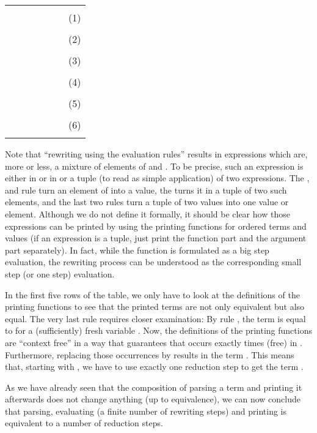 \documentclass[submission,copyright,creativecommons]{eptcs}
\newcommand{\lab}[1]{\mbox{(#1)}}
\begin{document}
\begin{center}
\begin{tabular}{|   rcl  |  rcl    | c  }
\cline{1-6}
&&&&&& \\
&& & && & \qquad \lab 1 \\
&&&&&& \\
&& & &&  & \qquad \lab 2 \\
&&&&&& \\
&& & &&  & \qquad \lab 3 \\
&&&&&& \\
&& & &&  & \qquad \lab 4 \\  
&&&&&& \\
&& & &&  & \qquad \lab 5\\
&&&&&& \\
&& & &&  & \qquad \lab 6\\
&&&&&& \\
\cline{1-6}
\end{tabular}
\end{center}

Note that ``rewriting using the evaluation rules'' results in expressions which are, more or less, a mixture of elements of  and . To be precise, such an expression is either in  or in  or a tuple (to read as simple application) of two expressions. The ,  and  rule turn an element of  into a value, the  turns it in a tuple of two such elements, and the last two rules turn a tuple of two values into one value or element. 
Although we do not define it formally, it should be clear how those expressions can be printed by using the printing functions for ordered terms and values (if an expression is a tuple, just print the function part and the argument part separately). In fact, while the function  is formulated as a big step evaluation, the rewriting process can be understood as the corresponding small step (or one step) evaluation.

In the first five rows of the table, we only have to look at the definitions of the printing functions to see that the printed terms are not only  equivalent but also equal. The very last rule  requires closer examination: 
By rule , the term  is equal to  for a (sufficiently) fresh variable . Now, the definitions of the printing functions are ``context free'' in a way that guarantees  that  occurs exactly  times (free) in . Furthermore, replacing those occurrences by  results in the term . This means that, starting with 
,
we have to use exactly one  reduction step to get the term .

As we have already seen that the composition of parsing a term and printing it afterwards does not change anything (up to  equivalence), we can now conclude that parsing, evaluating (a finite number of rewriting steps) and printing is equivalent to a number of  reduction steps.
\end{document}
